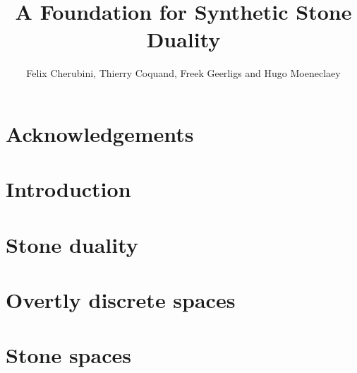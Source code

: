 \documentclass{zariski}
\title{A Foundation for Synthetic Stone Duality}
\begin{document}
\author{Felix Cherubini, Thierry Coquand, Freek Geerligs and Hugo Moeneclaey}

\maketitle
\begin{abstract}
  
\end{abstract}

\section*{Acknowledgements}



\section*{Introduction}




\section{Stone duality}







\section{Overtly discrete spaces}



%
%
\section{Stone spaces}


\end{document}
